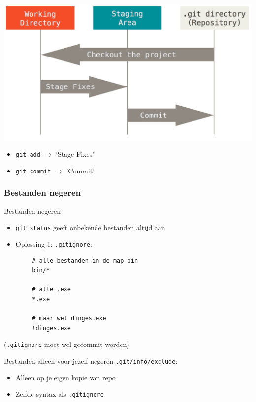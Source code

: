 \begin{frame}
	\begin{center}
		\includegraphics[width=\textwidth]{images/areas}
	\end{center}
	\begin{itemize}
		\item \texttt{git add} $\rightarrow$ 'Stage Fixes'
		\item \texttt{git commit} $\rightarrow$ 'Commit'
	\end{itemize}
\end{frame}

\subsubsection{Bestanden negeren}
\begin{frame}[fragile]{Bestanden negeren}
	\begin{itemize}
		\item \texttt{git status} geeft onbekende bestanden altijd aan
		\item Oplossing 1: \texttt{.gitignore}:
	\end{itemize}
	\begin{verbatim}
		# alle bestanden in de map bin
		bin/*

		# alle .exe
		*.exe

		# maar wel dinges.exe
		!dinges.exe
	\end{verbatim}
	(\texttt{.gitignore} moet wel gecommit worden)
\end{frame}

\begin{frame}{Bestanden alleen voor jezelf negeren}
	\texttt{.git/info/exclude}:
	\begin{itemize}
		\item Alleen op je eigen kopie van repo
		\item Zelfde syntax als \texttt{.gitignore}
	\end{itemize}
\end{frame}

